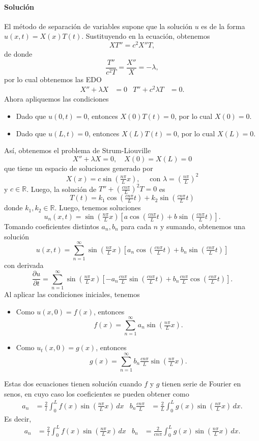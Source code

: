 \documentclass[11pt,letterpaper]{report}
\newcommand\R{\mathbb R}
\newcommand\<{\langle}
\renewcommand\>{\rangle}
\begin{document}
\paragraph{Solución}
El método de separación de variables supone que la solución $u$ es de
la forma $u(x,t)=X(x)T(t)$. Sustituyendo en la ecuación, obtenemos
\[
  XT''=c^2X''T
,\]
de donde
\[
  \frac{T''}{c^2T} = \frac{X''}{X} = -\lambda
,\]
por lo cual obtenemos las EDO
\begin{align*}
  X''+\lambda X &= 0
  &
  T''+c^2\lambda T &= 0.
\end{align*}
Ahora apliquemos las condiciones
\begin{itemize}
  \item Dado que $u(0,t)=0$, entonces $X(0)T(t)=0$, por lo cual
    $X(0)=0$.
  \item Dado que $u(L,t)=0$, entonces $X(L)T(t)=0$, por lo cual
    $X(L)=0$.
\end{itemize}
Así, obtenemos el problema de Strum-Liouville
\[
  X''+\lambda X = 0, \quad X(0)=X(L)=0
\]
que tiene un espacio de soluciones generado por
\[
  X(x)=c\sin(\tfrac{n\pi}{L}x), \quad \text{ con }
  \lambda=(\tfrac{n\pi}{L})^2
\]
y $c\in\R$.
Luego, la solución de $T''+(\tfrac{cn\pi}{L})^2T=0$ es 
\[
  T(t)=k_1\cos(\tfrac{cn\pi}{L}t)+k_2\sin(\tfrac{cn\pi}{L}t)
\]
donde $k_1,k_2\in\R$.
Luego, tenemos soluciones
\[
  u_n(x,t)=\sin(\tfrac{n\pi}{L}x) \left[
    a\cos(\tfrac{cn\pi}{L}t)+b\sin(\tfrac{cn\pi}{L}t)
  \right]
.\]
Tomando coeficientes distintos $a_n,b_n$ para cada $n$ y sumando,
obtenemos una solución
\[
  u(x,t)
  =
  \sum_{n=1}^{\infty}\sin(\tfrac{n\pi}{L}x) \left[
    a_n\cos(\tfrac{cn\pi}{L}t)
    +b_n\sin(\tfrac{cn\pi}{L}t)
  \right]
\]
con derivada
\[
  \frac{\partial u}{\partial t}
  =
  \sum_{n=1}^{\infty}\sin(\tfrac{n\pi}{L}x) \left[
    -a_n \tfrac{cn\pi}{L}\sin(\tfrac{cn\pi}{L}t)
    +b_n \tfrac{cn\pi}{L}\cos(\tfrac{cn\pi}{L}t)
  \right]
.\]
Al aplicar las condiciones iniciales, tenemos
\begin{itemize}
  \item Como $u(x,0)=f(x)$, entonces
    \[
      f(x)=\sum_{n=1}^{\infty}a_n\sin(\tfrac{n\pi}{L}x)
    .\]
  \item Como $u_t(x,0)=g(x)$, entonces
    \[
      g(x) = \sum_{n=1}^{\infty}b_n
      \tfrac{cn\pi}{L}\sin(\tfrac{n\pi}{L}x)
    .\]
\end{itemize}
Estas dos ecuaciones tienen solución cuando $f$ y $g$ tienen serie de
Fourier en senos, en cuyo caso los
coeficientes se pueden obtener como
\begin{align*}
  a_n &= \frac{2}{l}\int_{0}^{L}f(x)\sin(\tfrac{n\pi}{L}x)\,dx
      &
  b_n \tfrac{cn\pi}{L} &=
  \frac{2}{L}\int_{0}^{L}g(x)\sin(\tfrac{n\pi}{L}x)\,dx.
\end{align*}
Es decir,
\begin{align*}
  a_n &= \frac{2}{l}\int_{0}^{L}f(x)\sin(\tfrac{n\pi}{L}x)\,dx
      &
  b_n &=
  \frac{2}{cn\pi}\int_{0}^{L}g(x)\sin(\tfrac{n\pi}{L}x)\,dx.
\end{align*}
\end{document}
